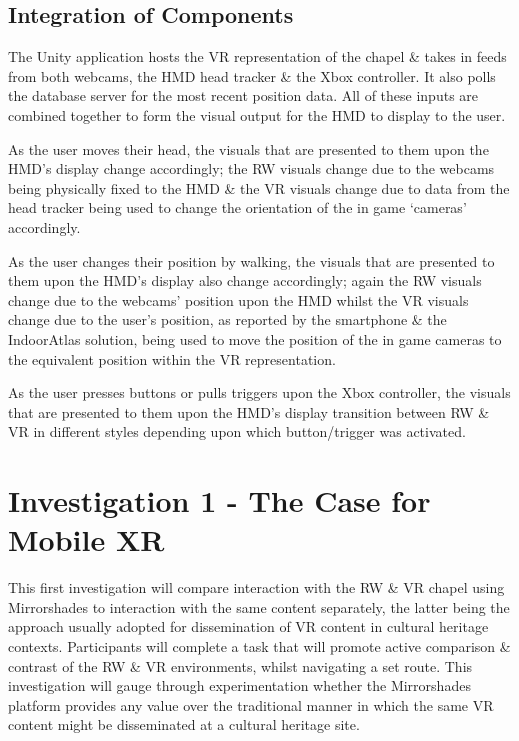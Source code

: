 \subsection{Integration of Components}
The Unity application hosts the VR representation of the chapel \& takes in feeds from both webcams, the HMD head tracker \& the Xbox controller. It also polls the database server for the most recent position data. All of these inputs are combined together to form the visual output for the HMD to display to the user.

As the user moves their head, the visuals that are presented to them upon the HMD's display change accordingly; the RW visuals change due to the webcams being physically fixed to the HMD \& the VR visuals change due to data from the head tracker being used to change the orientation of the in game `cameras' accordingly.

As the user changes their position by walking, the visuals that are presented to them upon the HMD's display also change accordingly; again the RW visuals change due to the webcams' position upon the HMD whilst the VR visuals change due to the user's position, as reported by the smartphone \& the IndoorAtlas solution, being used to move the position of the in game cameras to the equivalent position within the VR representation.

As the user presses buttons or pulls triggers upon the Xbox controller, the visuals that are presented to them upon the HMD's display transition between RW \& VR in different styles depending upon which button/trigger was activated.


\section{Investigation 1 - The Case for Mobile XR}
\label{investigation1}
This first investigation will compare interaction with the RW \& VR chapel using Mirrorshades to interaction with the same content separately, the latter being the approach usually adopted for dissemination of VR content in cultural heritage contexts. Participants will complete a task that will promote active comparison \& contrast of the RW \& VR environments, whilst navigating a set route. This investigation will gauge through experimentation whether the Mirrorshades platform provides any value over the traditional manner in which the same VR content might be disseminated at a cultural heritage site.

